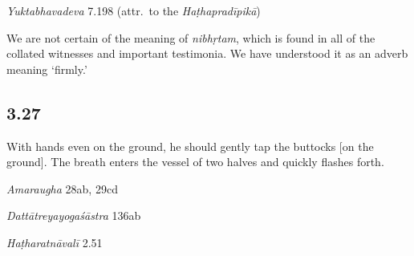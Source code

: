 \begin{ekdosis}
\begin{testimonia}[hp03_026]
\emph{Yuktabhavadeva} 7.198 (attr.~to the \emph{Haṭhapradīpikā})
\begin{versinnote}
\end{versinnote}
\end{testimonia}

\begin{philcomm}[hp03_026]
We are not certain of the meaning of \emph{nibhṛtam}, which is found in all of the collated witnesses and important testimonia. We have understood it as an adverb meaning `firmly.'
\end{philcomm}

\subsection*{3.27}
\begin{translation}[hp03_027]
With hands even on the ground, he should gently tap the buttocks [on the ground]. The breath enters the vessel of two halves and quickly flashes forth.
\end{translation}

\begin{sources}[hp03_027]
\emph{Amaraugha} 28ab, 29cd
\begin{versinnote}
\tl{[vedhayet kramayogena catuṣpīṭhaṃ tu vāyunā ||\\+}
\tl{āsphālayen mahāmeruṃ vāyuvajrāgnikoṭibhiḥ | ]\\+}
\tl{\var{samākṛṣya ] samākramya \vl }\\!}
\end{versinnote}

\emph{Dattātreyayogaśāstra} 136ab
\begin{versinnote}
\end{versinnote}
\end{sources}

\begin{testimonia}[hp03_027]
\emph{Haṭharatnāvalī} 2.51
\begin{versinnote}
\end{versinnote}


\end{testimonia}
\end{ekdosis}
